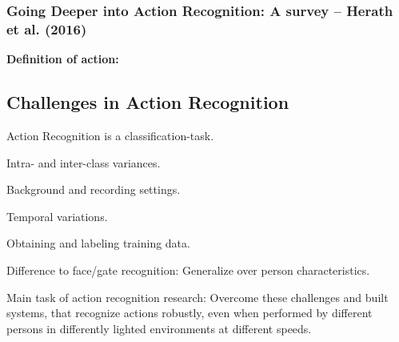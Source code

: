 \subsubsection{Going Deeper into Action Recognition: A survey -- Herath et al. (2016)}

\textbf{Definition of action:} 

\subsection{Challenges in Action Recognition}
Action Recognition is a classification-task.

Intra- and inter-class variances.

Background and recording settings.

Temporal variations.

Obtaining and labeling training data.

Difference to face/gate recognition: Generalize over person characteristics.

Main task of action recognition research: Overcome these challenges and built systems, that recognize actions robustly, even when performed by different persons in differently lighted environments at different speeds.

